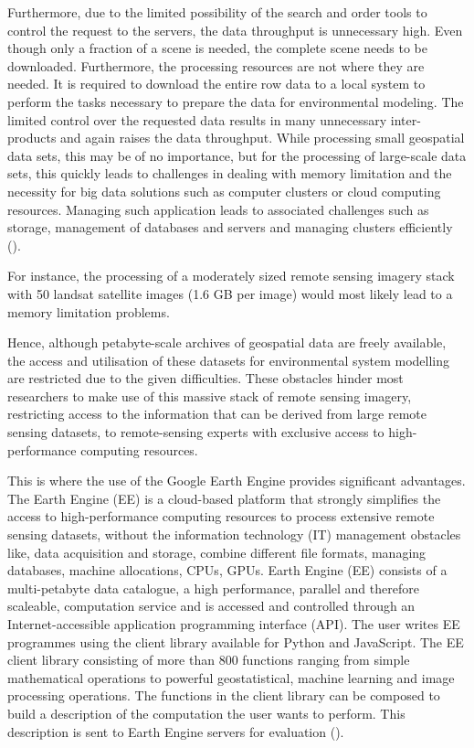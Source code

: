 Furthermore, due to the limited possibility of the search and order tools to control the request to the servers, the data throughput is unnecessary high. Even though only a fraction of a scene is needed, the complete scene needs to be downloaded. Furthermore, the processing resources are not where they are needed. It is required to download the entire row data to a local system to perform the tasks necessary to prepare the data for environmental modeling. The limited control over the requested data results in many unnecessary inter-products and again raises the data throughput. While processing small geospatial data sets, this may be of no importance, but for the processing of large-scale data sets, this quickly leads to challenges in dealing with memory limitation and the necessity for big data solutions such as computer clusters or cloud computing resources.
Managing such application leads to associated challenges such as storage, management of databases and servers and managing clusters efficiently (\cite{gorelick2017google}). 

For instance, the processing of a moderately sized remote sensing imagery stack with 50 landsat satellite images (1.6 GB per image) would most likely lead to a memory limitation problems.

Hence, although petabyte-scale archives of geospatial data are freely available, the access and utilisation of these datasets for environmental system modelling are restricted due to the given difficulties. 
These obstacles hinder most researchers to make use of this massive stack of remote sensing imagery, restricting access to the information that can be derived from large remote sensing datasets, to remote-sensing experts with exclusive access to high-performance computing resources.

\newpage

This is where the use of the Google Earth Engine provides significant advantages.
The Earth Engine (EE) is a cloud-based platform that strongly simplifies the access to high-performance computing resources to process extensive remote sensing datasets, without the information technology (IT) management obstacles like, data acquisition and storage, combine different file formats, managing databases, machine allocations, CPUs, GPUs. 
Earth Engine (EE) consists of a multi-petabyte data catalogue, a high performance, parallel and therefore scaleable, computation service and is accessed and controlled through an Internet-accessible application programming interface (API). The user writes EE programmes using the client library available for Python and JavaScript.
The EE client library consisting of more than 800 functions ranging from simple mathematical operations to powerful geostatistical, machine learning and image processing operations.
The functions in the client library can be composed to build a description of the computation the user wants to perform. This description is sent to Earth Engine servers for evaluation (\cite{gorelick2017google}).


